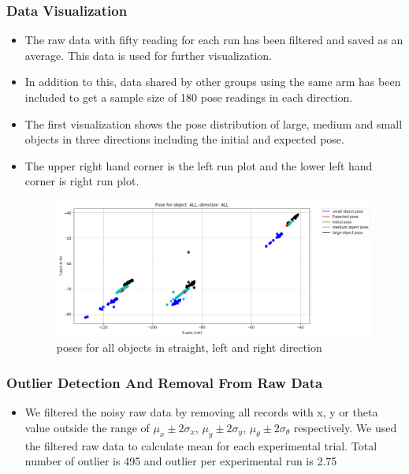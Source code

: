 \documentclass[10pt,a4paper]{article}
\begin{document}
						 \subsubsection{Data Visualization}
						\begin{itemize}
							\item The raw data with fifty reading for each run has been filtered and saved as an average. This data is used for further visualization. 
							\item In addition to this, data shared by other groups using the same arm has been included to get a sample size of 180 pose readings in each direction.
							\item The first visualization shows the pose distribution of large, medium and small objects in three directions including the initial and expected pose. 
							\item The upper right hand corner is the left run plot and the lower left hand corner is right run plot.
							\begin{figure}[h]
								\centering
								\includegraphics[width=1.0\linewidth]{img/pose_all_all.png}
								\caption{poses for all objects in straight, left and right direction}
								\label{fig:poses for all objects in straight, left and right direction}
							\end{figure}
					\end{itemize}			
	    				 \subsubsection{Outlier Detection And Removal From Raw Data}
	    				 \begin{itemize}
	    				 	\item We filtered the noisy raw data by removing all records with x, y or theta value outside the range of $\mu_x \pm 2\sigma_x$, $\mu_y \pm 2\sigma_y$, $\mu_\theta \pm 2\sigma_\theta$ respectively. We used the filtered raw data to calculate mean for each experimental trial. Total number of outlier is 495 and outlier per experimental run is 2.75
	    				 \end{itemize}
		    				 
\end{document}
